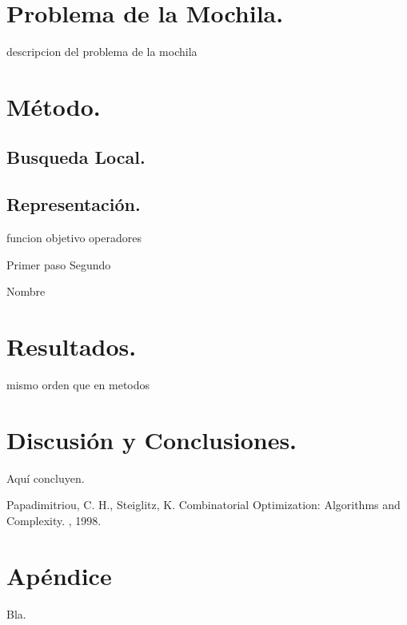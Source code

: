 \documentclass{ci5652}
\begin{document}
\section{Problema de la Mochila.}
descripcion del problema de la mochila
\section{Método.}
\subsection{Busqueda Local.}
\subsection{Representación.}
funcion objetivo
operadores

\begin{algorithm}
 \DontPrintSemicolon
 \vspace*{0.1cm}
 Primer paso\;
 Segundo\;
 \vspace*{0.1cm}
 \caption{Nombre}
\end{algorithm}


\section{Resultados.}
mismo orden que en metodos
\section{Discusión y Conclusiones.}
Aquí concluyen.


\small


\begin{thebibliography}{99}

Papadimitriou, C. H., Steiglitz, K. 
\newblock Combinatorial Optimization: Algorithms and Complexity. 
, 1998.

\end{thebibliography}


\newpage
\section*{Apéndice}

Bla.
\end{document}
